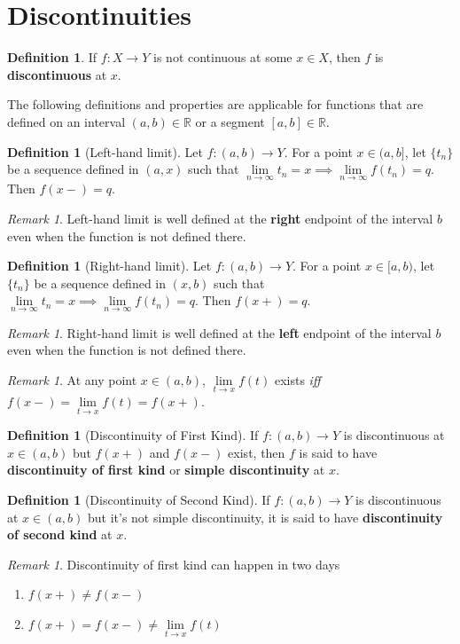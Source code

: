 \documentclass[a4paper,12pt]{report}
\newcommand{\R}{\mathbb{R}}
\newcommand{\tb}{\textbf}
\theoremstyle{plain}
\theoremstyle{definition}
\newtheorem{definition}[theorem]{\color{red}Definition} %
\theoremstyle{remark}
\newtheorem{remark}[theorem]{\color{ForestGreen}Remark} %
\begin{document}
\section{Discontinuities}
\begin{definition}
If $f:X\to Y$ is not continuous at some $x\in X$, then $f$ is \tb{discontinuous} at $x$.
\end{definition}
\noindent The following definitions and properties are applicable for functions that are defined on an interval $(a,b)\in\R$ or a segment $[a,b]\in\R$.
\begin{definition}[Left-hand limit] Let $f:(a,b)\to Y$. For a point $x\in(a,b]$, let $\{t_n\}$ be a sequence defined in $(a,x)$ such that $\lim\limits_{n\to\infty} t_n=x\implies\lim\limits_{n\to\infty}f(t_n)=q$. Then $f(x-)=q$.
\end{definition}
\begin{remark}
Left-hand limit is well defined at the \tb{right} endpoint of the interval $b$ even when the function is not defined there.
\end{remark}
\begin{definition}[Right-hand limit] Let $f:(a,b)\to Y$. For a point $x\in[a,b)$, let $\{t_n\}$ be a sequence defined in $(x,b)$ such that $\lim\limits_{n\to\infty} t_n=x\implies\lim\limits_{n\to\infty}f(t_n)=q$. Then $f(x+)=q$.
\end{definition}
\begin{remark}
Right-hand limit is well defined at the \tb{left} endpoint of the interval $b$ even when the function is not defined there.
\end{remark}
\begin{remark}
At any point $x\in(a,b)$, $\lim\limits_{t\to x}f(t)$ exists \emph{iff} $f(x-)=\lim\limits_{t\to x}f(t)=f(x+).$
\end{remark}
\begin{definition}[Discontinuity of First Kind] If $f:(a,b)\to Y$ is discontinuous at $x\in(a,b)$ but $f(x+)$ and $f(x-)$ exist, then $f$ is said to have \tb{discontinuity of first kind} or \tb{simple discontinuity} at $x$.
\end{definition}
\begin{definition}[Discontinuity of Second Kind] If $f:(a,b)\to Y$ is discontinuous at $x\in(a,b)$ but it's not simple discontinuity, it is said to have \tb{discontinuity of second kind} at $x$.
\end{definition}
\begin{remark} Discontinuity of first kind can happen in two days
\begin{enumerate}
\item $f(x+)\neq f(x-)$
\item $f(x+)=f(x-)\neq \lim\limits_{t\to x}f(t)$
\end{enumerate}
\end{remark}
\end{document}
